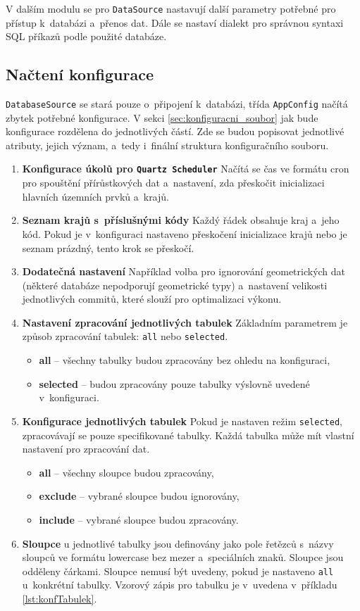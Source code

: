 V dalším modulu se pro \texttt{DataSource} nastavují další parametry potřebné pro přístup k~databázi a~přenos dat.
Dále se nastaví dialekt pro správnou syntaxi SQL příkazů podle použité databáze.

\subsection{Načtení konfigurace}
\label{sec:konfigurace}
\texttt{DatabaseSource} se stará pouze o~připojení k~databázi,
třída \texttt{AppConfig} načítá zbytek potřebné konfigurace.
V sekci \ref{sec:konfiguracni_soubor} jak bude konfigurace rozdělena do jednotlivých částí.
Zde se budou popisovat jednotlivé atributy, jejich význam, a~tedy i~finální struktura konfiguračního souboru.
\begin{enumerate}
    \item \textbf{Konfigurace úkolů pro \texttt{Quartz Scheduler}}
    Načítá se čas ve formátu cron pro spouštění přírůstkových dat
    a~nastavení, zda přeskočit inicializaci hlavních územních prvků a~krajů.
    \item \textbf{Seznam krajů s~příslušnými kódy}
    Každý řádek obsahuje kraj a~jeho kód.
    Pokud je v~konfiguraci nastaveno přeskočení inicializace krajů nebo je seznam prázdný, tento krok se přeskočí.
    \item \textbf{Dodatečná nastavení}
    Například volba pro ignorování geometrických dat
    (některé databáze nepodporují geometrické typy)
    a~nastavení velikosti jednotlivých commitů, které slouží pro optimalizaci výkonu.
    \item \textbf{Nastavení zpracování jednotlivých tabulek}
    Základním parametrem je způsob zpracování tabulek: \texttt{all} nebo \texttt{selected}.
    \begin{itemize}
        \item \textbf{all} -- všechny tabulky budou zpracovány bez ohledu na konfiguraci,
        \item \textbf{selected} -- budou zpracovány pouze tabulky výslovně uvedené v~konfiguraci.
    \end{itemize}
    \item \textbf{Konfigurace jednotlivých tabulek}
    Pokud je nastaven režim \texttt{selected}, zpracovávají se pouze specifikované tabulky.
    Každá tabulka může mít vlastní nastavení pro zpracování dat.
    \begin{itemize}
        \item \textbf{all} -- všechny sloupce budou zpracovány,
        \item \textbf{exclude} -- vybrané sloupce budou ignorovány,
        \item \textbf{include} -- vybrané sloupce budou zpracovány.
    \end{itemize}
    \item \textbf{Sloupce} u jednotlivé tabulky jsou definovány jako pole řetězců s~názvy sloupců
    ve formátu lowercase bez mezer a~speciálních znaků. Sloupce jsou odděleny čárkami.
    Sloupce nemusí být uvedeny, pokud je nastaveno \texttt{all} u~konkrétní tabulky.
    Vzorový zápis pro tabulku je v~uvedena v~příkladu \ref{lst:konfTabulek}.
\end{enumerate}

